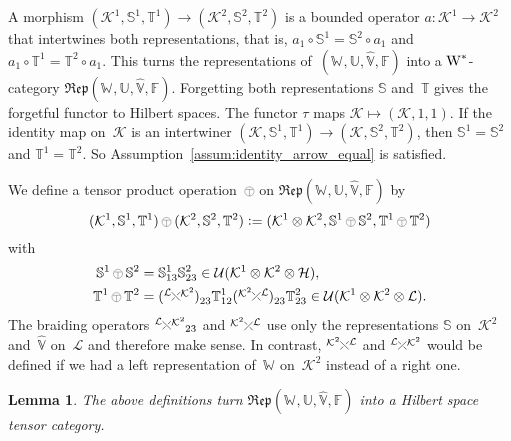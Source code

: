 \documentclass[a4paper]{amsart}
\numberwithin{equation}{section}
\theoremstyle{plain}
\numberwithin{theorem}{section}
\newtheorem{lemma}[theorem]{Lemma}
\theoremstyle{definition}
\theoremstyle{remark}
\newcommand{\tenscorep}{\mathbin{\begin{tikzpicture}[baseline,x=.75ex,y=.75ex] \draw[line width=.2pt] (-0.8,1.15)--(0.8,1.15);\draw[line width=.2pt](0,-0.25)--(0,1.15); \draw[line width=.2pt] (0,0.75) circle [radius = 1];\end{tikzpicture}}}
\newcommand*{\Braiding}[2]{\begin{tikzpicture}[baseline]
    \draw[-] (0,0) -- (1.4ex,1.4ex) node[right,inner sep=0pt] {$\scriptstyle #2$};
    \draw[-,draw=white,line width=2.4pt] (0,1.4ex) -- (1.4ex,0);
    \draw[-] (1.4ex,0) -- (0,1.4ex) node[left,inner sep=0pt] {$\scriptstyle #1$};
  \end{tikzpicture}}
\newcommand*{\Dualbraiding}[2]{\begin{tikzpicture}[baseline]
    \draw[-] (1.4ex,0) -- (0,1.4ex) node[left,inner sep=0pt] {$\scriptstyle #1$};
    \draw[-,draw=white,line width=2.4pt] (0,0) -- (1.4ex,1.4ex);
    \draw[-] (0,0) -- (1.4ex,1.4ex) node[right,inner sep=0pt] {$\scriptstyle #2$};
  \end{tikzpicture}}
\newcommand*{\Corep}[1]{\mathbb{#1}}          %
\newcommand*{\DuCorep}[1]{\hat{\Corep{#1}}}   %
\newcommand*{\Corepcat}[1]{\mathfrak{Rep}(#1)}%
\newcommand*{\Trivial}{\tau}%
\newcommand*{\nb}{\nobreakdash}
\newcommand*{\Multunit}[1][]{\mathbb W^{#1}}%
\newcommand*{\BrMultunit}{\mathbb F}%
\newcommand*{\Wst}{\textup W^*}%
\newcommand*{\Hils}[1][H]{\mathcal{#1}}%
\newcommand*{\U}{\mathcal U}%
\newcommand*{\defeq}{\mathrel{\vcentcolon=}}
\begin{document}
A morphism
\((\Hils[K]^1,\Corep{S}^1,\Corep{T}^1)\to
(\Hils[K]^2,\Corep{S}^2,\Corep{T}^2)\)
is a bounded operator \(a\colon \Hils[K]^1\to\Hils[K]^2\)
that intertwines both representations, that is,
\(a_1\circ \Corep{S}^1 = \Corep{S}^2\circ a_1\)
and \(a_1\circ \Corep{T}^1 = \Corep{T}^2\circ a_1\).
This turns the representations
of~\((\Multunit,\Corep{U},\DuCorep{V},\BrMultunit)\)
into a \(\Wst\)\nb-category
\(\Corepcat{\Multunit,\Corep{U},\DuCorep{V},\BrMultunit}\).
Forgetting both representations \(\Corep{S}\)
and~\(\Corep{T}\)
gives the forgetful functor to Hilbert spaces.  The functor
\(\Trivial\)
maps \(\Hils[K]\mapsto (\Hils[K],1,1)\).
If the identity map on~\(\Hils[K]\)
is an intertwiner
\((\Hils[K],\Corep{S}^1,\Corep{T}^1) \to
(\Hils[K],\Corep{S}^2,\Corep{T}^2)\),
then \(\Corep{S}^1=\Corep{S}^2\)
and \(\Corep{T}^1=\Corep{T}^2\).
So Assumption~\ref{assum:identity_arrow_equal} is satisfied.

We define a tensor product operation~\(\tenscorep\)
on \(\Corepcat{\Multunit,\Corep{U},\DuCorep{V},\BrMultunit}\) by
\[
(\Hils[K]^1,\Corep{S}^1,\Corep{T}^1) \tenscorep
(\Hils[K]^2,\Corep{S}^2,\Corep{T}^2)
\defeq
(\Hils[K]^1\otimes \Hils[K]^2,
\Corep{S}^1 \tenscorep \Corep{S}^2,
\Corep{T}^1 \tenscorep \Corep{T}^2)
\]
with
\begin{align*}
  \Corep{S}^1 \tenscorep \Corep{S}^2 &= \Corep{S}^1_{13}\Corep{S}^2_{23}
  \in \U(\Hils[K]^1\otimes\Hils[K]^2\otimes\Hils),\\
  \Corep{T}^1 \tenscorep \Corep{T}^2 &=
  (\Braiding{\Hils[L]}{\Hils[K]^2})^{\phantom1}_{23}
  \Corep{T}^1_{12} (\Dualbraiding{\Hils[K]^2}{\Hils[L]})^{\phantom1}_{23}
  \Corep{T}^2_{23}
  \in \U(\Hils[K]^1\otimes\Hils[K]^2\otimes\Hils[L]).
\end{align*}
The braiding operators \(\Braiding{\Hils[L]}{\Hils[K]^2}_{23}\)
and \(\Dualbraiding{\Hils[K]^2}{\Hils[L]}\)
use only the representations \(\Corep{S}\)
on~\(\Hils[K]^2\)
and~\(\DuCorep{V}\)
on~\(\Hils[L]\)
and therefore make sense.  In contrast,
\(\Braiding{\Hils[K]^2}{\Hils[L]}\)
and \(\Dualbraiding{\Hils[L]}{\Hils[K]^2}\)
would be defined if we had a left representation of~\(\Multunit\)
on~\(\Hils[K]^2\) instead of a right one.

\begin{lemma}
  \label{lem:corep_braided}
  The above definitions turn
  \(\Corepcat{\Multunit,\Corep{U},\DuCorep{V},\BrMultunit}\)
  into a Hilbert space tensor category.
\end{lemma}
\end{document}
